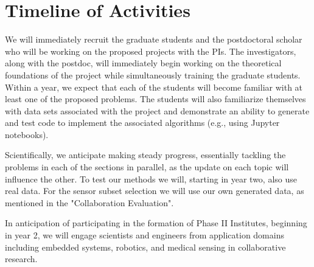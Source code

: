 \section{Timeline of Activities}
We will immediately recruit the graduate students and the postdoctoral scholar who will be working on the proposed projects with the PIs. The investigators, along with the postdoc, will immediately begin working on the theoretical foundations of the project while simultaneously training the graduate students. Within a year, we expect that each of the students will become familiar with at least one of the proposed problems. The students will also familiarize themselves with data sets associated with the project and demonstrate an ability to generate and test code to implement the associated algorithms (e.g., using Jupyter notebooks). 

Scientifically, we anticipate making steady progress, essentially tackling the problems in each of the sections in parallel, as the update on each topic will influence the other. To test our methods we will, starting in year two, also use real data. For the sensor subset selection we will use our own generated data, as mentioned in the "Collaboration Evaluation". 

In anticipation of participating in the formation of Phase II Institutes, beginning in year 2, we will  engage scientists and engineers from application domains including embedded systems, robotics, and medical sensing in collaborative research. 